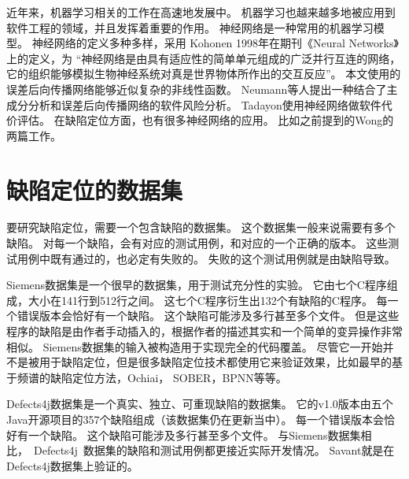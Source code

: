 近年来，机器学习相关的工作在高速地发展中。
机器学习也越来越多地被应用到软件工程的领域，并且发挥着重要的作用。
神经网络是一种常用的机器学习模型。
神经网络的定义多种多样，采用 Kohonen 1998年在期刊《Neural Networks》上的定义，为
“神经网络是由具有适应性的简单单元组成的广泛并行互连的网络，它的组织能够模拟生物神经系统对真是世界物体所作出的交互反应”。
本文使用的误差后向传播网络能够近似复杂的非线性函数\parencite{Hecht1992Theory}。
Neumann等人提出一种结合了主成分分析和误差后向传播网络的软件风险分析\parencite{Neumann2002An}。
Tadayon使用神经网络做软件代价评估。
在缺陷定位方面，也有很多神经网络的应用。
比如之前提到的Wong的两篇工作\parencite{W2009BP,Wong2012Effective}。

\section{缺陷定位的数据集}

要研究缺陷定位，需要一个包含缺陷的数据集。
这个数据集一般来说需要有多个缺陷。
对每一个缺陷，会有对应的测试用例，和对应的一个正确的版本。
这些测试用例中既有通过的，也必定有失败的。
失败的这个测试用例就是由缺陷导致。

Siemens数据集\parencite{Hutchins1994Experiments}是一个很早的数据集，用于测试充分性的实验。
它由七个C程序组成，大小在141行到512行之间。
这七个C程序衍生出132个有缺陷的C程序。
每一个错误版本会恰好有一个缺陷。
这个缺陷可能涉及多行甚至多个文件。
但是这些程序的缺陷是由作者手动插入的，根据作者的描述其实和一个简单的变异操作非常相似。
Siemens数据集的输入被构造用于实现完全的代码覆盖。
尽管它一开始并不是被用于缺陷定位，但是很多缺陷定位技术都使用它来验证效果，比如最早的基于频谱的缺陷定位方法\parencite{Renieres2003Fault}，Ochiai\parencite{Abreu2006An,Abreu2007On}，
SOBER\parencite{Liu2006Statistical}，BPNN\parencite{W2009BP}等等。

Defects4j数据集\parencite{Just2014Defects4J}是一个真实、独立、可重现缺陷的数据集。
它的v1.0版本由五个Java开源项目的357个缺陷组成（该数据集仍在更新当中）。
每一个错误版本会恰好有一个缺陷。
这个缺陷可能涉及多行甚至多个文件。
与Siemens数据集相比，~Defects4j~数据集的缺陷和测试用例都更接近实际开发情况。
Savant\parencite{Le2016A}就是在Defects4j数据集上验证的。
